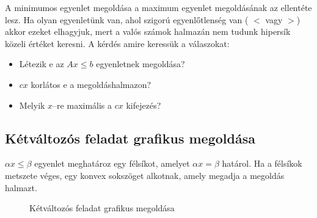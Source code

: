A minimumos egyenlet megoldása a maximum egyenlet megoldásának az ellentéte
lesz. Ha olyan egyenletünk van, ahol szigorú egyenlőtlenség van ( $<$ vagy $>$)
akkor ezeket elhagyjuk, mert a valós számok halmazán nem tudunk hipersík közeli
értéket keresni. A kérdés amire keressük a válaszokat:

\begin{itemize}
  \item Létezik e az $Ax \leq b$ egyenletnek megoldása?
  \item $cx$ korlátos e a megoldáshalmazon?
  \item Melyik $x$--re maximális a $cx$ kifejezés?
\end{itemize}

\subsection{Kétváltozós feladat grafikus megoldása}

$\alpha x \leq \beta$ egyenlet meghatároz egy félsíkot, amelyet $\alpha x = \beta$
határol. Ha a félsíkok metszete véges, egy konvex sokszöget alkotnak, amely megadja a
megoldás halmazt.

\begin{figure}[htbp]
\centering
{}
\caption{Kétváltozós feladat grafikus megoldása} \label{fig:KetValtGraf}
\end{figure}

